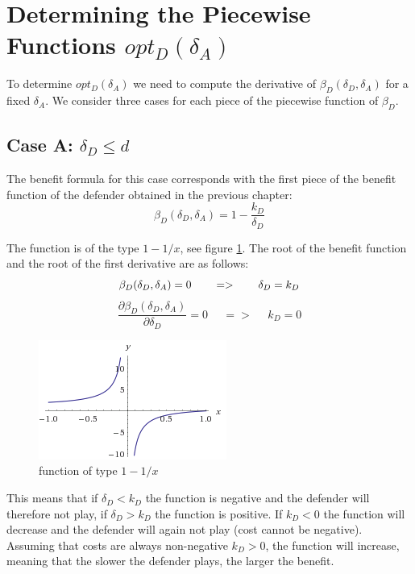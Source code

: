 \section{Determining the Piecewise Functions $opt_{D}(\delta_{A})$}

To determine $opt_{D}(\delta_{A})$ we need to compute the derivative of  $\beta_{D}(\delta_{D},\delta_{A}) $ for a fixed $\delta_{A}$.
 We consider three cases for each piece of the piecewise function of $\beta_{D}$.
 
 
\subsection*{Case A: $\delta_{D} \leq d$}

The benefit formula for this case corresponds with the first piece of the benefit function of the defender obtained in the previous chapter:
\begin{equation}
\beta_{D}(\delta_{D},\delta_{A}) = 1 - \dfrac{k_{D}}{\delta_{D}}
\end{equation}


The function is of the type $1-1/x$, see figure \ref{1x}. The root of the benefit function  and the root of the first derivative are as follows:
\begin{equation}
\beta_{D}(\delta_{D},\delta_{A}) =0  ~~~~~~ =>~~~~~~\delta_{D} = k_{D} \\
\end{equation}
\begin{equation}
\dfrac{\partial \beta_{D}(\delta_{D},\delta_{A})}{\partial \delta_{D}} =0 ~~~~~~ =>~~~~~~ k_{D} = 0
\end{equation}

\begin{figure}[hbtp]
\centering
\includegraphics[scale=1]{Images/1x.png}
\caption{function of type $1-1/x$}
\label{1x}
\end{figure}

This means that if $\delta_{D} < k_{D}$  the function is negative and the defender will therefore not play, if $\delta_{D} > k_{D}$ the function is positive. If $k_{D} < 0$ the function will decrease and the defender will again not play (cost cannot be negative).  Assuming that costs are always non-negative $k_{D} > 0$, the function will increase, meaning that the slower the defender plays, the larger the benefit.



